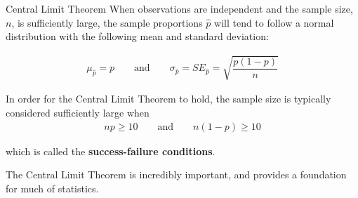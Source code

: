 \documentclass{beamer}
\begin{document}
\begin{frame}
  \begin{block}{Central Limit Theorem}
    When observations are independent and the sample size, $n$, is sufficiently large, the sample proportions $\hat{p}$ will tend to follow a normal distribution with the following mean and standard deviation:

    \vspace{-1mm}
    \begin{equation*}
      \begin{aligned}
        \mu_{\hat{p}}=p
        \qquad\text{and}\qquad
        \sigma_{\hat{p}}={SE}_{\hat{p}}=\sqrt{\dfrac{p(1-p)}{n}}
      \end{aligned}
    \end{equation*}\pause

    \vspace{-1mm}
    In order for the Central Limit Theorem to hold, the sample size is typically considered sufficiently large when
    \vspace{-2mm}
    \begin{equation*}
      \begin{aligned}
        np\geq 10
        \qquad\text{and}\qquad
        n(1-p)\geq 10
      \end{aligned}
    \end{equation*}

    \vspace{-2mm}
    which is called the \textbf{success-failure conditions}.
  \end{block}\pause

  \begin{note}
    The Central Limit Theorem is incredibly important, and provides a foundation for much of statistics.
  \end{note}
\end{frame}
\end{document}
